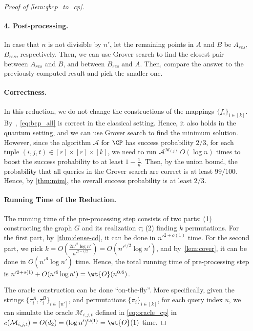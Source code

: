 \begin{proof}[Proof of \cref{lem:qbcp_to_cp}]
\paragraph*{4. Post-processing.} In case that $n$ is not divisible by $n'$, let the remaining points in $A$ and $B$ be $A_{res}$, $B_{res}$, respectively. Then, we can use Grover search to find the closest pair between $A_{res}$ and $B$, and between $B_{res}$ and $A$. Then, compare the answer to the previously computed result and pick the smaller one.

\paragraph*{Correctness.} In this reduction, we do not change the constructions of the mappings $\{f_i\}_{i\in [k]}$. By~\cite{r29}, \cref{eq:bcp_all} is correct in the classical setting. Hence, it also holds in the quantum setting, and we can use Grover search to find the minimum solution. However, since the algorithm $\mathcal{A}$ for $\CP$  has success probability $2/3$, for each tuple $(i,j,t)\in [r]\times [r]\times [k]$, we need to run $\mathcal{A}^{\mathcal{M}_{i,j,t}}$ $O(\log n)$ times to boost the success probability to at least $1-\frac{1}{n}$. Then, by the union bound, the probability that all queries in the Grover search are correct is at least $99/100$. Hence, by \cref{thm:mim}, the overall success probability is at least $2/3$.  


\paragraph*{Running Time of the Reduction.} 

The running time of the pre-processing step consists of two parts: (1) constructing the graph $G$ and its realization $\tau$; (2) finding $k$ permutations. For the first part, by~\cref{thm:dense-cd}, it can be done in $n'^{2+o(1)}$ time. For the second part, we pick $k=O(\frac{2n'^2\log n'}{n'^{2-\epsilon/2}})=O(n'^{\epsilon/2}\log n')$, and by~\cref{lem:cover}, it can be done in $O(n'^6 \log n')$ time. Hence, the total running time of pre-processing step is $n'^{2+o(1)}+O(n'^6\log n')=\wt{O}(n^{0.6})$.

The oracle construction can be done ``on-the-fly''. More specifically, given the strings $\{\tau^A_i,\tau^B_i\}_{i\in [n']}$, and permutations $\{\pi_i\}_{i\in [k]}$, for each query index $u$, we can simulate the oracle $\mathcal{M}_{i,j,t}$ defined in \cref{eq:oracle_cp} in $c(\mathcal{M}_{i,j,t})=O(d_2)=(\log n')^{\Omega(1)}=\wt{O}(1)$ time.


\end{proof}
